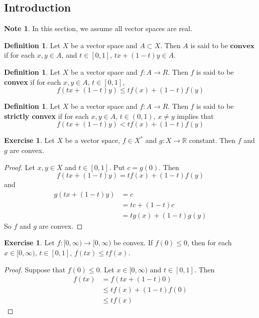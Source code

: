 \documentclass[12pt]{amsart}
\theoremstyle{definition}
\newtheorem{defn}[definition]{Definition}
\newtheorem{note}[definition]{Note}
\newtheorem{ex}[definition]{Exercise}
\newcommand{\R}{\mathbb{R}}
\newcommand{\ui}{[0,1]}
\newcommand{\Rg}{[0,\infty)}
\newcommand{\lex}[1]{\label{ex:#1}}
\newcommand{\ld}[1]{\label{defn:#1}}
\begin{document}
	\subsection{Introduction}

	\begin{note}
	In this section, we assume all vector spaces are real.
	\end{note}

	\begin{defn} \ld{91001}
	Let $X$ be a vector space and $A \subset X$. Then $A$ is said to be $\textbf{convex}$ if for each $x, y \in A$, and $t \in [0,1]$,  $tx + (1-t)y \in A$. 
	\end{defn}	
	
	\begin{defn} \ld{91002}
	Let $X$ be a vector space and $f:A \rightarrow R$. Then $f$ is said to be \textbf{convex} if for each $x,y \in A$, $t \in \ui$, $$f(tx + (1-t)y) \leq tf(x) + (1-t)f(y)$$
	\end{defn}
	
	\begin{defn} \ld{91003}
	Let $X$ be a vector space and $f:A \rightarrow R$. Then $f$ is said to be \textbf{strictly convex} if for each $x,y \in A$, $t \in (0,1)$, $x \neq y$ implies that $$f(tx + (1-t)y) < tf(x) + (1-t)f(y)$$
	\end{defn}
	
	\begin{ex} \lex{91004}
	Let $X$ be a vector space, $f \in X^*$ and $g: X \rightarrow \R$ constant. Then $f$ and $g$ are convex. 
	\end{ex}
	
	\begin{proof}
		Let $x, y \in X$ and $t \in \ui$. Put $c = g(0)$. Then $$f(tx + (1-t)y) = tf(x) + (1-t)f(y)$$ and 
		\begin{align*}
		g(tx + (1-t)y) 
		&= c\\ 
		&= tc + (1-t)c \\
		&= tg(x) + (1-t)g(y)
		\end{align*}
		So $f$ and $g$ are convex.
	\end{proof}		

	\begin{ex}
		Let $f:\Rg \rightarrow \Rg$ be convex. If $f(0) \leq 0$, then for each $x \in \Rg$, $t \in [0,1]$, $f(tx) \leq tf(x)$.
	\end{ex}

	\begin{proof}
		Suppose that $f(0) \leq 0$. Let $x \in \Rg$ and $t \in [0,1]$. Then 
		\begin{align*}
			f(tx)
			&= f(tx + (1-t)0) \\
			& \leq tf(x) + (1-t)f(0) \\
			& \leq tf(x)
		\end{align*}
	\end{proof}
\end{document}
